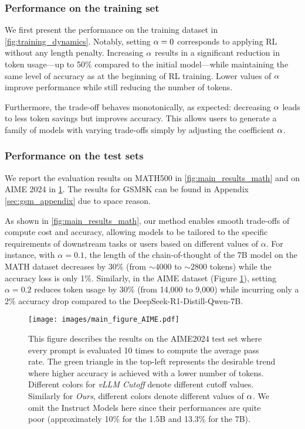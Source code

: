 \subsubsection{Performance on the training set}
We first present the performance on the training dataset in \cref{fig:training_dynamics}. Notably, setting $\alpha = 0$ corresponds to applying RL without any length penalty. Increasing $\alpha$ results in a significant reduction in token usage—up to 50\% compared to the initial model—while maintaining the same level of accuracy as at the beginning of RL training. Lower values of $\alpha$ improve performance while still reducing the number of tokens.

Furthermore, the trade-off behaves monotonically, as expected: decreasing $\alpha$ leads to less token savings but improves accuracy. This allows users to generate a family of models with varying trade-offs simply by adjusting the coefficient $\alpha$.

\subsubsection{Performance on the test sets}
We report the evaluation results on MATH500 in \cref{fig:main_results_math} and on AIME 2024 in \cref{fig:main_results_aime}. The results for GSM8K can be found in Appendix \ref{sec:gsm_appendix} due to space reason. 


As shown in \cref{fig:main_results_math}, our method enables smooth trade-offs of compute cost and accuracy, allowing models to be tailored to the specific requirements of downstream tasks or users based on different values of \( \alpha \). For instance, with \( \alpha = 0.1 \), the length of the chain-of-thought of the 7B model on the MATH dataset decreases by 30\% (from $\sim 4000$ to $\sim 2800$ tokens) while the accuracy loss is only 1\%. Similarly, in the AIME dataset (Figure \ref{fig:main_results_aime}), setting \( \alpha = 0.2 \) reduces token usage by 30\% (from 14,000 to 9,000) while incurring only a 2\% accuracy drop compared to the DeepSeek-R1-Distill-Qwen-7B.


\begin{figure*}[h]
\centering
  \texttt{[image: images/main\_figure\_AIME.pdf]}
  \vspace{-1em}
  \caption{This figure describes the results on the AIME2024 test set where every prompt is evaluated 10 times to compute the average pass rate. The green triangle in the top-left represents the desirable trend where higher accuracy is achieved with a lower number of tokens. Different colors for \emph{vLLM Cutoff} denote different cutoff values. Similarly for \emph{Ours}, different colors denote different values of $\alpha$. We omit the Instruct Models here since their performances are quite poor (approximately 10\% for the 1.5B and 13.3\% for the 7B).}
  \label{fig:main_results_aime}
\end{figure*}

